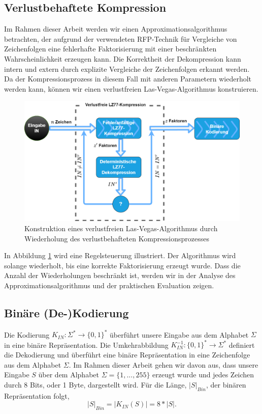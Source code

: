 \subsection{Verlustbehaftete Kompression}
Im Rahmen dieser Arbeit werden wir einen Approximationsalgorithmus betrachten, der aufgrund der verwendeten RFP-Technik für Vergleiche von Zeichenfolgen eine fehlerhafte Faktorisierung mit 
einer beschränkten Wahrscheinlichkeit erzeugen kann. Die Korrektheit der Dekompression kann intern und extern durch explizite Vergleiche der Zeichenfolgen erkannt werden. Da der
Kompressionsprozess in diesem Fall mit anderen Parametern wiederholt werden kann, können wir einen verlustfreien Las-Vegas-Algorithmus konstruieren.

\begin{figure}
    \centering
    \caption{Konstruktion eines verlustfreien Las-Vegas-Algorithmus durch Wiederholung des verlustbehafteten Kompressionsprozesses}
    \label{fig:lasvegas}
    \includegraphics[scale=0.25]{Images/lasvegas_algorithm.png}
\end{figure}

In Abbildung \ref{fig:lasvegas} wird eine Regelsteuerung illustriert. Der Algorithmus wird solange wiederholt, bis eine korrekte Faktorisierung erzeugt wurde. Dass die
Anzahl der Wiederholungen beschränkt ist, werden wir in der Analyse des Approximationsalgorithmus und der praktischen Evaluation zeigen.

\subsection{Binäre (De-)Kodierung}
Die Kodierung $K_{IN}: \Sigma^* \rightarrow \{0,1\}^*$ überführt unsere Eingabe aus dem Alphabet $\Sigma$ in eine binäre Repräsentation.
Die Umkehrabbildung $K^{-1}_{IN}: \{0,1\}^* \rightarrow \Sigma^*$ definiert die Dekodierung und überführt eine binäre Repräsentation in eine Zeichenfolge
aus dem Alphabet $\Sigma$. Im Rahmen dieser Arbeit gehen wir davon aus, dass unsere Eingabe $S$ über dem Alphabet $\Sigma=\{1,...,255\}$ erzeugt wurde und 
jedes Zeichen durch 8 Bits, oder 1 Byte, dargestellt wird. Für die Länge, $|S|_{Bin}$, der binären Repräsentation folgt,
\begin{equation}
    |S|_{Bin} = |K_{IN}(S)| = 8*|S|.
\end{equation}

